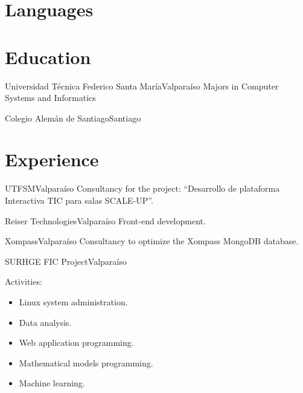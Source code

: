 \documentclass[11pt,letterpaper,sans]{moderncv}
\begin{document}
  \makecvtitle{}

  \section{Languages}

  \section{Education}
      {Universidad Técnica Federico Santa María}{Valparaíso}{}
      {Majors in Computer Systems and Informatics}

      {Colegio Alemán de Santiago}{Santiago}{}
      {}

  \section{Experience}
      {UTFSM}{Valparaíso}{}
      {
        Consultancy for the project: ``Desarrollo de plataforma Interactiva TIC
        para salas SCALE-UP''.
      }

    \pagebreak[0]

      {Reiser Technologies}{Valparaíso}{}
      {
        Front-end development.
      }

    \pagebreak[0]

      {Xompass}{Valparaíso}{}
      {
        Consultancy to optimize the Xompass MongoDB database.
      }

    \pagebreak[0]

      {SURHGE FIC Project}{Valparaíso}{}
      {
        Activities:
        \begin{itemize}
          \item Linux system administration.
          \item Data analysis.
          \item Web application programming.
          \item Mathematical models programming.
          \item Machine learning.
        \end{itemize}
      }
\end{document}
